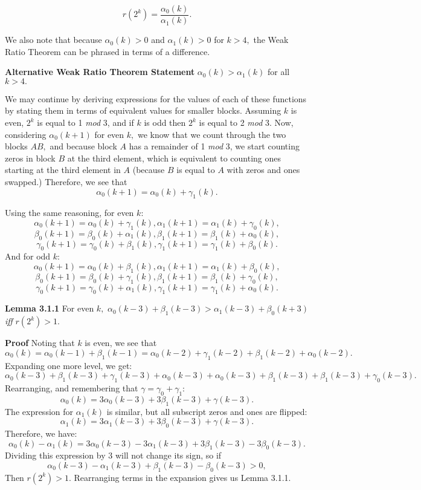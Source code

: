 \documentclass{article}
\begin{document}
$$r(2^k) = \frac{\alpha_0(k)}{\alpha_1(k)}.$$

We also note that because $\alpha_0(k) > 0$ and $\alpha_1(k) > 0$ for $k > 4,$ the Weak Ratio Theorem can be phrased in terms of a difference.

\textbf{Alternative Weak Ratio Theorem Statement} $\alpha_0(k) > \alpha_1(k)$ for all $k > 4.$

We may continue by deriving expressions for the values of each of these functions by stating them in terms of equivalent values for smaller blocks. Assuming $k$ is even, $2^k$ is equal to 1 \emph{mod} 3, and if $k$ is odd then $2^k$ is equal to 2 \emph{mod} 3. Now, considering $\alpha_0(k+1)$ for even $k,$ we know that we count through the two blocks $AB,$ and because block $A$ has a remainder of 1 \emph{mod} 3, we start counting zeros in block $B$ at the third element, which is equivalent to counting ones starting at the third element in $A$ (because $B$ is equal to $A$ with zeros and ones swapped.) Therefore, we see that
$$\alpha_0(k+1) = \alpha_0(k) + \gamma_1(k).$$

Using the same reasoning, for even $k:$
$$\alpha_0(k+1) = \alpha_0(k) + \gamma_1(k), \alpha_1(k+1) = \alpha_1(k) + \gamma_0(k),$$
$$\beta_0(k+1) = \beta_0(k) + \alpha_1(k), \beta_1(k+1) = \beta_1(k) + \alpha_0(k),$$
$$\gamma_0(k+1) = \gamma_0(k) + \beta_1(k), \gamma_1(k+1) = \gamma_1(k) + \beta_0(k).$$
And for odd $k:$
$$\alpha_0(k+1) = \alpha_0(k) + \beta_1(k), \alpha_1(k+1) = \alpha_1(k) + \beta_0(k),$$
$$\beta_0(k+1) = \beta_0(k) + \gamma_1(k), \beta_1(k+1) = \beta_1(k) + \gamma_0(k),$$
$$\gamma_0(k+1) = \gamma_0(k) + \alpha_1(k), \gamma_1(k+1) = \gamma_1(k) + \alpha_0(k).$$

\textbf{Lemma 3.1.1} For even $k,$ $\alpha_0(k-3) + \beta_1(k-3) > \alpha_1(k-3) + \beta_0(k+3)$ \emph{iff} $r(2^k) > 1.$

\textbf{Proof} Noting that $k$ is even, we see that
$$\alpha_0(k) = \alpha_0(k-1) + \beta_1(k-1) = \alpha_0(k-2) + \gamma_1(k-2) + \beta_1(k-2) + \alpha_0(k-2).$$
Expanding one more level, we get:
$$\alpha_0(k-3) + \beta_1(k-3) + \gamma_1(k-3) + \alpha_0(k-3) + \alpha_0(k-3) + \beta_1(k-3) + \beta_1(k-3) + \gamma_0(k-3).$$
Rearranging, and remembering that $\gamma = \gamma_0 + \gamma_1:$
$$\alpha_0(k) = 3 \alpha_0(k-3) + 3 \beta_1(k-3) + \gamma(k-3).$$
The expression for $\alpha_1(k)$ is similar, but all subscript zeros and ones are flipped:
$$\alpha_1(k) = 3 \alpha_1(k-3) + 3 \beta_0(k-3) + \gamma(k-3).$$
Therefore, we have:
$$ \alpha_0(k) - \alpha_1(k) = 3 \alpha_0(k-3) - 3 \alpha_1(k-3) + 3 \beta_1(k-3) - 3 \beta_0(k-3).$$
Dividing this expression by $3$ will not change its sign, so if
$$\alpha_0(k-3) - \alpha_1(k-3) + \beta_1(k-3) - \beta_0(k-3) > 0,$$
Then $r(2^k) > 1.$ Rearranging terms in the expansion gives us Lemma 3.1.1.
\end{document}

